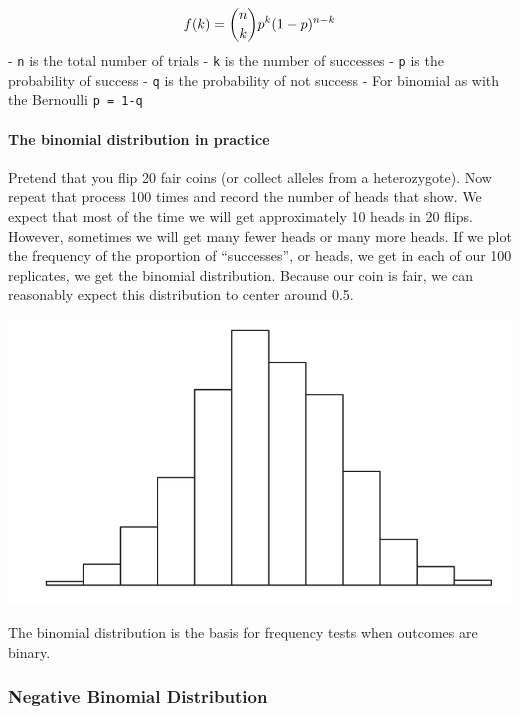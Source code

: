 \documentclass[]{book}
\let\oldparagraph\paragraph
\renewcommand{\paragraph}[1]{\oldparagraph{#1}\mbox{}}
\begin{document}
\[\large f(k) = {n \choose k} p^{k} (1-p)^{n-k}\]
- \texttt{n} is the total number of trials
- \texttt{k} is the number of successes
- \texttt{p} is the probability of success
- \texttt{q} is the probability of not success
- For binomial as with the Bernoulli \texttt{p\ =\ 1-q}

\hypertarget{the-binomial-distribution-in-practice}{%
\paragraph{\texorpdfstring{The \textbf{binomial distribution} in practice}{The binomial distribution in practice}}\label{the-binomial-distribution-in-practice}}

Pretend that you flip 20 fair coins (or collect alleles from a heterozygote). Now repeat that process 100 times and record the number of heads that show. We expect that most of the time we will get approximately 10 heads in 20 flips. However, sometimes we will get many fewer heads or many more heads. If we plot the frequency of the proportion of ``successes'', or heads, we get in each of our 100 replicates, we get the binomial distribution. Because our coin is fair, we can reasonably expect this distribution to center around 0.5.

\begin{center}\includegraphics[width=1\linewidth]{images/week_2.003} \end{center}

The binomial distribution is the basis for frequency tests when outcomes are binary.

\hypertarget{negative-binomial-distribution}{%
\subsubsection{\texorpdfstring{\textbf{Negative Binomial Distribution}}{Negative Binomial Distribution}}\label{negative-binomial-distribution}}
\end{document}
